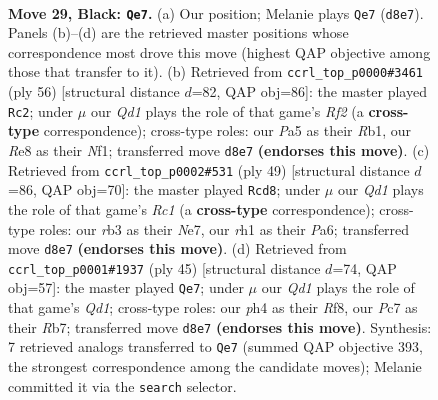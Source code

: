 \documentclass[11pt]{article}
\begin{document}
\clearpage

\begin{figure}[p]\centering
\begin{subfigure}{0.46\textwidth}\centering
\resizebox{\linewidth}{!}{%
\newchessgame
\chessboard[
  setfen={rn1qr1k1/2pn3p/1p2p1p1/p3Pp2/P2P1P1P/1RP2NN1/6PQ/3K3R b - - 0 29},
  showmover=false,
  pgfstyle=straightmove, color=movearrow, markmove={d8-e7}
]}
\caption{}
\end{subfigure}\hfill
\begin{subfigure}{0.46\textwidth}\centering
\resizebox{\linewidth}{!}{%
\newchessgame
\chessboard[
  setfen={1r4k1/q2nnpp1/p1ppr2p/4p3/PP2P3/1NQPP2P/5RPK/1R3N2 w - - 3 29},
  showmover=false,
  pgfstyle=straightmove, color=movearrow, markmove={f2-c2}
]}
\caption{}
\end{subfigure}
\\[4pt]
\begin{subfigure}{0.46\textwidth}\centering
\resizebox{\linewidth}{!}{%
\newchessgame
\chessboard[
  setfen={2r1r1k1/2q1npp1/pp1pp2p/2n5/P1P1PP1P/1PN2QP1/1RN4K/3R4 b - - 6 25},
  showmover=false,
  pgfstyle=straightmove, color=movearrow, markmove={c8-d8}
]}
\caption{}
\end{subfigure}\hfill
\begin{subfigure}{0.46\textwidth}\centering
\resizebox{\linewidth}{!}{%
\newchessgame
\chessboard[
  setfen={3q1r2/1r4pk/R2ppnnp/1pp1p3/4P3/3PPN1P/1PP1QNP1/R5K1 b - - 11 23},
  showmover=false,
  pgfstyle=straightmove, color=movearrow, markmove={d8-e7}
]}
\caption{}
\end{subfigure}
\caption{\textbf{Move 29, Black: \texttt{Qe7}.} (a) Our position; Melanie plays \texttt{Qe7} (\texttt{d8e7}). Panels (b)--(d) are the retrieved master positions whose correspondence most drove this move (highest QAP objective among those that transfer to it). (b) Retrieved from \texttt{ccrl\_top\_p0000\#3461} (ply 56) [structural distance $d$=82, QAP obj=86]: the master played \texttt{Rc2}; under $\mu$ our \emph{Qd1} plays the role of that game's \emph{Rf2} (a \textbf{cross-type} correspondence); cross-type roles: our \emph{P}a5 as their \emph{R}b1, our \emph{R}e8 as their \emph{N}f1; transferred move \texttt{d8e7} \textbf{(endorses this move)}. (c) Retrieved from \texttt{ccrl\_top\_p0002\#531} (ply 49) [structural distance $d$=86, QAP obj=70]: the master played \texttt{Rcd8}; under $\mu$ our \emph{Qd1} plays the role of that game's \emph{Rc1} (a \textbf{cross-type} correspondence); cross-type roles: our \emph{r}b3 as their \emph{N}e7, our \emph{r}h1 as their \emph{P}a6; transferred move \texttt{d8e7} \textbf{(endorses this move)}. (d) Retrieved from \texttt{ccrl\_top\_p0001\#1937} (ply 45) [structural distance $d$=74, QAP obj=57]: the master played \texttt{Qe7}; under $\mu$ our \emph{Qd1} plays the role of that game's \emph{Qd1}; cross-type roles: our \emph{p}h4 as their \emph{R}f8, our \emph{P}c7 as their \emph{R}b7; transferred move \texttt{d8e7} \textbf{(endorses this move)}. Synthesis: 7 retrieved analogs transferred to \texttt{Qe7} (summed QAP objective 393, the strongest correspondence among the candidate moves); Melanie committed it via the \texttt{search} selector.}
\label{fig:thought-m57}
\end{figure}
\end{document}
